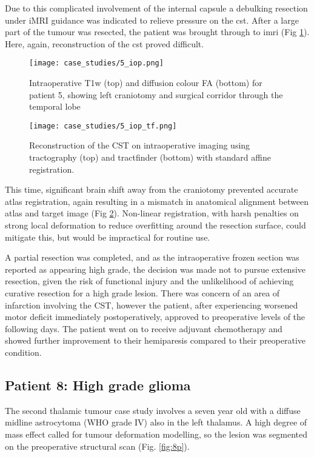 Due to this complicated involvement of the internal capsule a debulking resection under iMRI guidance was indicated to relieve pressure on the \gls{cst}.
After a large part of the tumour was resected, the patient was brought through to \gls{imri} (Fig \ref{fig:5i}).
Here, again, reconstruction of the \gls{cst} proved difficult.

\begin{figure}
  \centering
  \texttt{[image: case\_studies/5\_iop.png]}
  \caption{Intraoperative T1w (top) and diffusion colour FA (bottom) for patient 5, showing left craniotomy and surgical corridor through the temporal lobe}
  \label{fig:5i}
\end{figure}

\begin{figure}
  \centering
  \texttt{[image: case\_studies/5\_iop\_tf.png]}
  \caption{Reconstruction of the CST on intraoperative imaging using tractography (top) and tractfinder (bottom) with standard affine registration.}
  \label{fig:5i_cst}
\end{figure}

This time, significant brain shift away from the craniotomy prevented accurate atlas registration, again resulting in a mismatch in anatomical alignment between atlas and target image (Fig \ref{fig:5i_cst}).
Non-linear registration, with harsh penalties on strong local deformation to reduce overfitting around the resection surface, could mitigate this, but would be impractical for routine use.

A partial resection was completed, and as the intraoperative frozen section  was reported as appearing high grade, the decision was made not to pursue extensive resection, given the risk of functional injury and the unlikelihood of achieving curative resection for a high grade lesion. 
There was concern of an area of infarction involving the CST, however the patient, after experiencing worsened motor deficit immediately postoperatively, approved to preoperative levels of the following days.
The patient went on to receive adjuvant chemotherapy and showed further improvement to their hemiparesis compared to their preoperative condition.

\subsection{Patient 8: High grade glioma}

The second thalamic tumour case study involves a seven year old with a diffuse midline astrocytoma (WHO grade IV) also in the left thalamus.
A high degree of mass effect called for tumour deformation modelling, so the lesion was segmented on the preoperative structural scan (Fig. \ref{fig:8p}).

